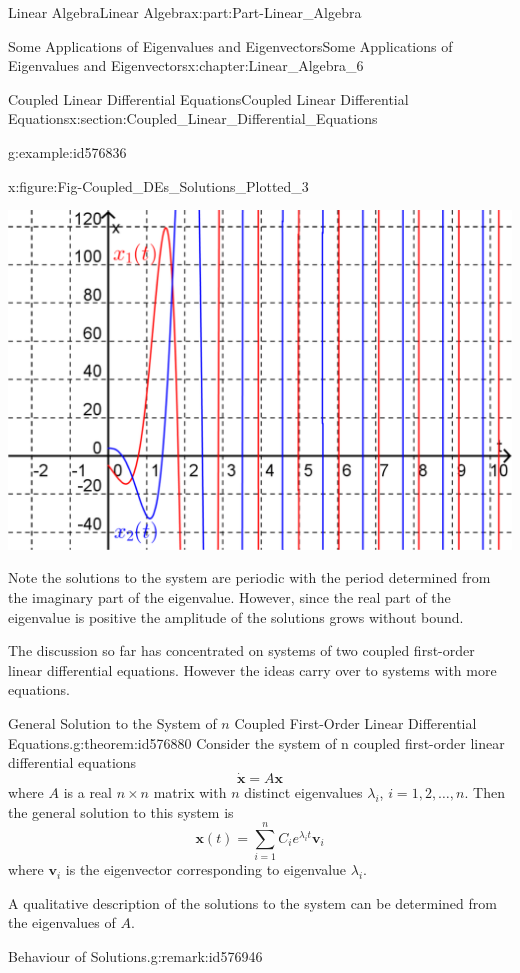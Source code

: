 \documentclass[oneside,10pt,]{book}
\numberwithin{equation}{section}
\newcommand{\bm}[1]{\boldsymbol{#1}}
\begin{document}
\begin{partptx}{Linear Algebra}{}{Linear Algebra}{}{}{x:part:Part-Linear_Algebra}
\begin{chapterptx}{Some Applications of Eigenvalues and Eigenvectors}{}{Some Applications of Eigenvalues and Eigenvectors}{}{}{x:chapter:Linear_Algebra_6}
\begin{sectionptx}{Coupled Linear Differential Equations}{}{Coupled Linear Differential Equations}{}{}{x:section:Coupled_Linear_Differential_Equations}
\begin{example}{}{g:example:id576836}
\begin{figureptx}{}{x:figure:Fig-Coupled_DEs_Solutions_Plotted_3}{}
\begin{image}{0.15}{0.7}{0.15}%
\includegraphics[width=\linewidth]{./LinearAlgebra/Images/6/Fig3-solution_curves_plotted_3.png}
\end{image}%
\tcblower
\end{figureptx}%
Note the solutions to the system are periodic with the period determined from the imaginary part of the eigenvalue. However, since the real part of the eigenvalue is positive the amplitude of the solutions grows without bound.%
\end{example}
The discussion so far has concentrated on systems of two coupled first-order linear differential equations. However the ideas carry over to systems with more equations.%
\begin{theorem}{General Solution to the System of \(n\) Coupled First-Order Linear Differential Equations.}{}{g:theorem:id576880}%
Consider the system of n coupled first-order linear differential equations%
\begin{equation*}
\dot{\bm{x}} = A \bm{x}
\end{equation*}
where \(A\) is a real \(n \times n\) matrix with \(n\) distinct eigenvalues \(\lambda_i\), \(i = 1,2,\ldots,n\). Then the general solution to this system is%
\begin{equation*}
\bm{x}(t) = \sum_{i=1}^{n} C_i e^{\lambda_i t} \bm{v}_i
\end{equation*}
where \(\bm{v}_i\) is the eigenvector corresponding to eigenvalue \(\lambda_i\).\end{theorem}
A qualitative description of the solutions to the system can be determined from the eigenvalues of \(A\).%
\begin{remark}{Behaviour of Solutions.}{g:remark:id576946}%

\end{remark}
\end{sectionptx}
\end{chapterptx}
\end{partptx}
\end{document}
